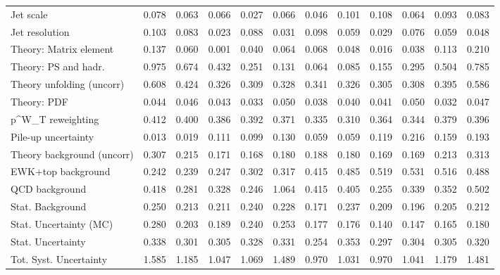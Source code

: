 \begin{tabular}{l|p{0.6cm}p{0.6cm}p{0.6cm}p{0.6cm}p{0.6cm}p{0.6cm}p{0.6cm}p{0.6cm}p{0.6cm}p{0.6cm}p{0.6cm}}
Jet scale                                & 0.078 & 0.063 & 0.066 & 0.027 & 0.066 & 0.046 & 0.101 & 0.108 & 0.064 & 0.093 & 0.083 \\
Jet resolution                           & 0.103 & 0.083 & 0.023 & 0.088 & 0.031 & 0.098 & 0.059 & 0.029 & 0.076 & 0.059 & 0.048 \\
Theory: Matrix element                   & 0.137 & 0.060 & 0.001 & 0.040 & 0.064 & 0.068 & 0.048 & 0.016 & 0.038 & 0.113 & 0.210 \\
Theory: PS and hadr.                     & 0.975 & 0.674 & 0.432 & 0.251 & 0.131 & 0.064 & 0.085 & 0.155 & 0.295 & 0.504 & 0.785 \\
Theory unfolding (uncorr)                & 0.608 & 0.424 & 0.326 & 0.309 & 0.328 & 0.341 & 0.326 & 0.305 & 0.308 & 0.395 & 0.586 \\
Theory: PDF                              & 0.044 & 0.046 & 0.043 & 0.033 & 0.050 & 0.038 & 0.040 & 0.041 & 0.050 & 0.032 & 0.047 \\
p^{W}_{T} reweighting                    & 0.412 & 0.400 & 0.386 & 0.392 & 0.371 & 0.335 & 0.310 & 0.364 & 0.344 & 0.379 & 0.396 \\
Pile-up uncertainty                      & 0.013 & 0.019 & 0.111 & 0.099 & 0.130 & 0.059 & 0.059 & 0.119 & 0.216 & 0.159 & 0.193 \\
Theory background (uncorr)               & 0.307 & 0.215 & 0.171 & 0.168 & 0.180 & 0.188 & 0.180 & 0.169 & 0.169 & 0.213 & 0.313 \\
EWK+top background                       & 0.242 & 0.239 & 0.247 & 0.302 & 0.317 & 0.415 & 0.485 & 0.519 & 0.531 & 0.516 & 0.488 \\
QCD background                           & 0.418 & 0.281 & 0.328 & 0.246 & 1.064 & 0.415 & 0.405 & 0.255 & 0.339 & 0.352 & 0.502 \\
Stat. Background                         & 0.250 & 0.213 & 0.211 & 0.240 & 0.228 & 0.171 & 0.237 & 0.209 & 0.196 & 0.205 & 0.212 \\
Stat. Uncertainty (MC)                   & 0.280 & 0.203 & 0.189 & 0.240 & 0.253 & 0.177 & 0.176 & 0.140 & 0.147 & 0.165 & 0.180 \\
\hline
Stat. Uncertainty                        & 0.338 & 0.301 & 0.305 & 0.328 & 0.331 & 0.254 & 0.353 & 0.297 & 0.304 & 0.305 & 0.320 \\
\hline
Tot. Syst. Uncertainty                   & 1.585 & 1.185 & 1.047 & 1.069 & 1.489 & 0.970 & 1.031 & 0.970 & 1.041 & 1.179 & 1.481 \\
\hline
\end{tabular}
